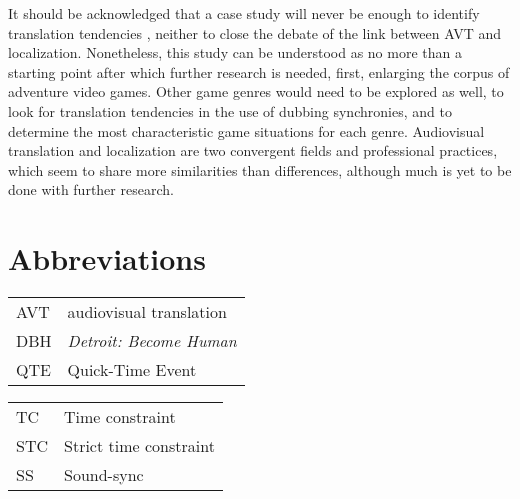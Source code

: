 \documentclass[output=paper]{langsci/langscibook}
\begin{document}
It should be acknowledged that a case study will never be enough to identify translation tendencies \parencite{toury95}, neither to close the debate of the link between AVT and localization. Nonetheless, this study can be understood as no more than a starting point after which further research is needed, first, enlarging the corpus of adventure video games. Other game genres would need to be explored as well, to look for translation tendencies in the use of dubbing synchronies, and to determine the most characteristic game situations for each genre. Audiovisual translation and localization are two convergent fields and professional practices, which seem to share more similarities than differences, although much is yet to be done with further research.

\section*{Abbreviations}

\begin{tabularx}{.45\textwidth}{lQ}
AVT & audiovisual translation \\
DBH & \textit{Detroit: Become Human}\\
QTE & Quick-Time Event\\
\end{tabularx}
\begin{tabularx}{.45\textwidth}{lQ}
TC & Time constraint\\
STC & Strict time constraint\\
SS & Sound-sync\\
\end{tabularx}

{\sloppy\printbibliography[heading=subbibliography,notkeyword=this]}
\end{document}
